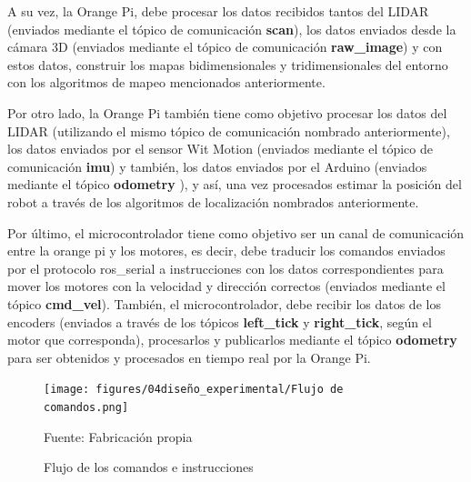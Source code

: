 A su vez, la Orange Pi, debe procesar los datos recibidos tantos del LIDAR (enviados mediante el tópico de comunicación \textbf{scan}), los datos enviados desde la cámara 3D (enviados mediante el tópico de comunicación \textbf{raw\_image}) y con estos datos, construir los mapas bidimensionales y tridimensionales del entorno con los algoritmos de mapeo mencionados anteriormente.

Por otro lado, la Orange Pi también tiene como objetivo procesar los datos del LIDAR (utilizando el mismo tópico de comunicación nombrado anteriormente), los datos enviados por el sensor Wit Motion (enviados mediante el tópico de comunicación \textbf{imu}) y también, los datos enviados por el Arduino (enviados mediante el tópico \textbf{odometry}
), y así, una vez procesados estimar la posición del robot a través de los algoritmos de localización nombrados anteriormente.

Por último, el microcontrolador tiene como objetivo ser un canal de comunicación entre la orange pi y los motores, es decir, debe traducir los comandos enviados por el protocolo ros\_serial a instrucciones con los datos correspondientes para mover los motores con la velocidad y dirección correctos (enviados mediante el tópico \textbf{cmd\_vel}). También, el microcontrolador, debe recibir los datos de los encoders (enviados a través de los tópicos \textbf{left\_tick} y \textbf{right\_tick}, según el motor que corresponda), procesarlos y publicarlos mediante el tópico \textbf{odometry} para ser obtenidos y procesados en tiempo real por la Orange Pi.

\begin{figure}[H]
\centering
\texttt{[image: figures/04diseño\_experimental/Flujo de comandos.png]}
\caption{\label{fig:flujo_comandos} Flujo de los comandos e instrucciones} Fuente: Fabricación propia
\end{figure}



